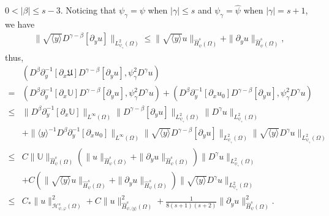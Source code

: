 \documentclass{amsart}
\numberwithin{equation}{section}
\newcommand\y{{{\langle y \rangle}}}
\begin{document}
 $0<|\beta|\leq s-3$. Noticing that $\psi_{\gamma}=\psi$ when $|\gamma|\leq s$ and $\psi_{\gamma}=\hat{\psi}$ when $|\gamma|=s+1$, we have
\begin{align*}
\|\sqrt{\y}D^{\gamma-\beta}[\partial_{y}u]\|_{L_{\psi_{\gamma}}^{2}(\Omega)}
\leq \|\sqrt{\y}u\|_{\hat{H}_{\psi}^{s}(\Omega)}+\|\partial_{y}u\|_{\hat{H}_{\psi}^{s}(\Omega)},
\end{align*}
thus,
\begin{align*}
&(D^{\beta}\partial_{y}^{-1}[\partial_{x}\mathfrak{U}]D^{\gamma-\beta}[\partial_{y}u],\psi_{\gamma}^{2}D^{\gamma}u)\\
=& (D^{\beta}\partial_{y}^{-1}[\partial_{x}\mathbb{U}]D^{\gamma-\beta}[\partial_{y}u],\psi_{\gamma}^{2}D^{\gamma}u)
  +(D^{\beta}\partial_{y}^{-1}[\partial_{x}u_{0}]D^{\gamma-\beta}[\partial_{y}u],\psi_{\gamma}^{2}D^{\gamma}u)\\
\leq& \|D^{\beta}\partial_{y}^{-1}[\partial_{x}\mathbb{U}]\|_{L^{\infty}(\Omega)}
      \|D^{\gamma-\beta}[\partial_{y}u]\|_{L_{\psi_{\gamma}}^{2}(\Omega)}
      \|D^{\gamma}u\|_{L_{\psi_{\gamma}}^{2}(\Omega)}\\
    &+\|\y^{-1}D^{\beta}\partial_{y}^{-1}[\partial_{x}u_{0}]\|_{L^{\infty}(\Omega)}
      \|\sqrt{\y}D^{\gamma-\beta}[\partial_{y}u]\|_{L_{\psi_{\gamma}}^{2}(\Omega)}
      \|\sqrt{\y}D^{\gamma}u\|_{L_{\psi_{\gamma}}^{2}(\Omega)}\\
\leq& C\|\mathbb{U}\|_{\hat{H}_{\psi}^{s}(\Omega)}
       \left(\|u\|_{\hat{H}_{\psi}^{s}(\Omega)}+\|\partial_{y}u\|_{\hat{H}_{\psi}^{s}(\Omega)}\right)
       \|D^{\gamma}u\|_{L_{\psi_{\gamma}}^{2}(\Omega)}\\
    &+C\left(\|\sqrt{\y}u\|_{\hat{H}_{\psi}^{s}(\Omega)}+\|\partial_{y}u\|_{\hat{H}_{\psi}^{s}(\Omega)}\right)
       \|\sqrt{\y}D^{\gamma}u\|_{L_{\psi_{\gamma}}^{2}(\Omega)}\\
\leq& C_{*}\|u\|_{\mathcal{H}_{\psi,\varphi}^{s}(\Omega)}^{2}
     +C\|u\|_{\hat{H}_{\psi,\y}^{s}(\Omega)}^{2}
     +\frac{1}{8(s+1)(s+2)}\|\partial_{y}u\|_{\hat{H}_{\psi}^{s}(\Omega)}^{2}.
\end{align*}
\end{document}
